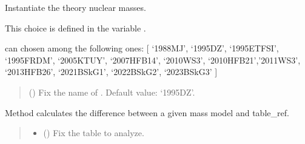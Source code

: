 \documentclass[letterpaper,10pt,english]{sphinxmanual}
\begin{document}
\begin{fulllineitems}
\label{\detokenize{source/api/setup_nuc_be_theo:nucleardatapy.nuc.setup_be_theo.setupBETheo}}
\pysigstartsignatures
{}
\pysigstopsignatures
\sphinxAtStartPar
Instantiate the theory nuclear masses.

\sphinxAtStartPar
This choice is defined in the variable .

\sphinxAtStartPar
{} can chosen among the following ones:     {[} ‘1988\sphinxhyphen{}MJ’, ‘1995\sphinxhyphen{}DZ’, ‘1995\sphinxhyphen{}ETFSI’, ‘1995\sphinxhyphen{}FRDM’,     ‘2005\sphinxhyphen{}KTUY’, ‘2007\sphinxhyphen{}HFB14’, ‘2010\sphinxhyphen{}WS3’, ‘2010\sphinxhyphen{}HFB21’,’2011\sphinxhyphen{}WS3’, ‘2013\sphinxhyphen{}HFB26’, ‘2021\sphinxhyphen{}BSkG1’,     ‘2022\sphinxhyphen{}BSkG2’, ‘2023\sphinxhyphen{}BSkG3’ {]}
\begin{quote}\begin{description}
\sphinxAtStartPar
{} (\sphinxstyleliteralemphasis{\sphinxupquote{, }}) \textendash{} Fix the name of . Default value: ‘1995\sphinxhyphen{}DZ’.

\end{description}\end{quote}

\sphinxAtStartPar
{}

\begin{fulllineitems}
\label{\detokenize{source/api/setup_nuc_be_theo:nucleardatapy.nuc.setup_be_theo.setupBETheo.diff}}
\pysigstartsignatures
{}
\pysigstopsignatures
\sphinxAtStartPar
Method calculates the difference between a given mass
model and table\_ref.
\begin{quote}\begin{description}
\begin{itemize}
\item {} 
\sphinxAtStartPar
{} () \textendash{} Fix the table to analyze.


\end{itemize}
\end{description}
\end{quote}
\end{fulllineitems}
\end{fulllineitems}
\end{document}
